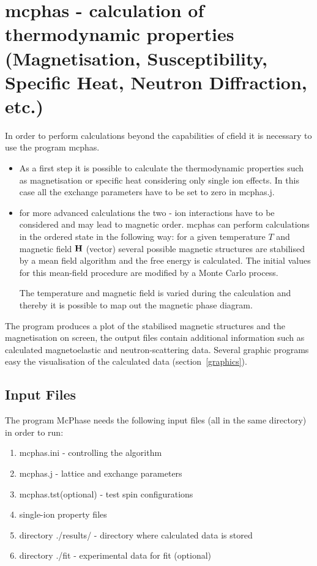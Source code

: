 \section{{\prg mcphas} - calculation of thermodynamic properties (Magnetisation, Susceptibility, Specific Heat, Neutron %
Diffraction, etc.)}
\label{runmcphas}

In order to perform calculations beyond the capabilities of {\prg cfield} it is necessary
to use the program {\prg mcphas}. 
\begin{itemize}
\item As a first step it is possible to
calculate the thermodynamic properties such as magnetisation or specific heat
considering only single ion effects. In this case all the exchange parameters
have to be set to zero in {\prg mcphas.j}. 
\item for more advanced calculations the two - ion interactions have to be
considered and may lead to magnetic order. {\prg mcphas} can perform 
calculations in the ordered state in the following way: for 
a given temperature $T$ and magnetic field $\mathbf H$ (vector)
several possible magnetic structures are stabilised
by a mean field algorithm and the free energy is 
calculated. The initial values for this mean-field procedure are
modified by a Monte Carlo process.


The temperature and magnetic field is varied during the calculation
and thereby it is possible to map out the magnetic phase diagram.
\end{itemize}

The program produces a plot of the stabilised magnetic
structures and the magnetisation on screen, the
output files contain additional information 
such as calculated magnetoelastic and  neutron-scattering
data. Several graphic programs easy the visualisation of the
calculated data (section~\ref{graphics}).



\subsection{Input Files}
The program {\prg McPhase} needs the following input files (all in the same directory)
 in order to run:

\begin{enumerate}
\item {\prg mcphas.ini}
 - controlling the algorithm
\item {\prg mcphas.j}
  - lattice and exchange parameters
\item {\prg mcphas.tst(optional)}  - test spin configurations
\item {\prg single-ion property files}
\item {\prg directory ./results/}
 - directory where calculated data is stored
\item {\prg directory ./fit} - experimental data for fit (optional)
\end{enumerate}


